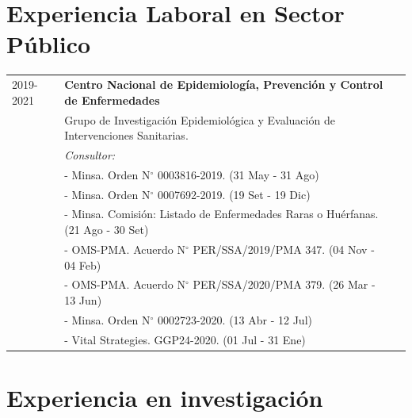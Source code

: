 \documentclass[margin,line]{res}
\begin{document}
\begin{resume}
		\section{\sc Experiencia Laboral en Sector Público} %

		\begin{tabular}{ l l l }
			2019-2021 & \textbf{Centro Nacional de Epidemiolog\'ia, Prevenci\'on y Control de Enfermedades}&\\
			& Grupo de Investigaci\'on Epidemiol\'ogica y Evaluaci\'on de Intervenciones Sanitarias.&\\
			&\textit{Consultor:}&\\
			& - Minsa. Orden N$^{\circ}$ 0003816-2019. (31 May - 31 Ago)&\\
			& - Minsa. Orden N$^{\circ}$ 0007692-2019. (19 Set - 19 Dic)&\\
			& - Minsa. Comisión: Listado de Enfermedades Raras o Huérfanas. (21 Ago - 30 Set)&\\
			& - OMS-PMA. Acuerdo N$^{\circ}$ PER/SSA/2019/PMA 347. (04 Nov - 04 Feb)&\\
			& - OMS-PMA. Acuerdo N$^{\circ}$ PER/SSA/2020/PMA 379. (26 Mar - 13 Jun)&\\
			& - Minsa. Orden N$^{\circ}$ 0002723-2020. (13 Abr - 12 Jul)&\\
			& - Vital Strategies. GGP24-2020. (01 Jul - 31 Ene)&\\
		\end{tabular}	
		
		\section{\sc Experiencia en investigación} %
		

\end{resume}
\end{document}
